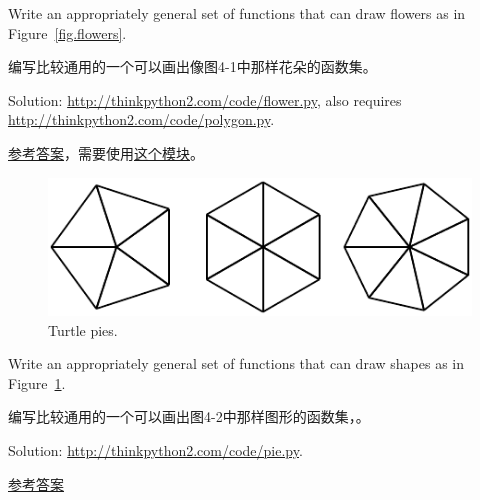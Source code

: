 \begin{exercise}

Write an appropriately general set of functions that
can draw flowers as in Figure~\ref{fig.flowers}.

编写比较通用的一个可以画出像图4-1中那样花朵的函数集。

Solution: \url{http://thinkpython2.com/code/flower.py},
also requires \url{http://thinkpython2.com/code/polygon.py}.

\href{http://thinkpython2.com/code/flower.py}{参考答案}，需要使用\href{http://thinkpython2.com/code/polygon.py}{这个模块}。

\end{exercise}



\begin{figure}
\centerline
{\includegraphics[scale=0.8]{../source/figs/pies.pdf}}
\caption{Turtle pies.}
\label{fig.pies}
\end{figure}


\begin{exercise}

Write an appropriately general set of functions that
can draw shapes as in Figure~\ref{fig.pies}.

编写比较通用的一个可以画出图4-2中那样图形的函数集，。

Solution: \url{http://thinkpython2.com/code/pie.py}.

\href{http://thinkpython2.com/code/pie.py}{参考答案}

\end{exercise}

